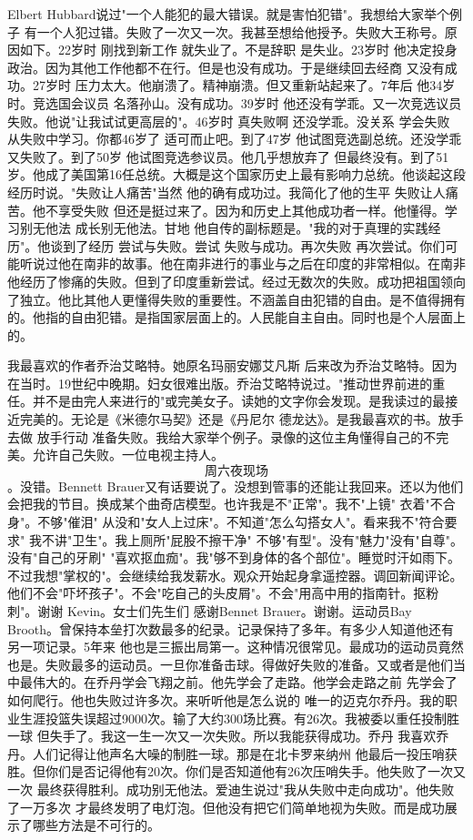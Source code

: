 Elbert Hubbard说过"一个人能犯的最大错误。就是害怕犯错"。我想给大家举个例子 有一个人犯过错。失败了一次又一次。我甚至想给他授予。失败大王称号。原因如下。22岁时 刚找到新工作 就失业了。不是辞职 是失业。23岁时 他决定投身政治。因为其他工作他都不在行。但是也没有成功。于是继续回去经商 又没有成功。27岁时 压力太大。他崩溃了。精神崩溃。但又重新站起来了。7年后 他34岁时。竞选国会议员 名落孙山。没有成功。39岁时 他还没有学乖。又一次竞选议员失败。他说"让我试试更高层的"。46岁时 真失败啊 还没学乖。没关系 学会失败 从失败中学习。你都46岁了 适可而止吧。到了47岁 他试图竞选副总统。还没学乖 又失败了。到了50岁 他试图竞选参议员。他几乎想放弃了 但最终没有。到了51岁。他成了美国第16任总统。大概是这个国家历史上最有影响力总统。他谈起这段经历时说。"失败让人痛苦"当然 他的确有成功过。我简化了他的生平 失败让人痛苦。他不享受失败 但还是挺过来了。因为和历史上其他成功者一样。他懂得。学习别无他法 成长别无他法。甘地 他自传的副标题是。"我的对于真理的实践经历"。他谈到了经历 尝试与失败。尝试 失败与成功。再次失败 再次尝试。你们可能听说过他在南非的故事。他在南非进行的事业与之后在印度的非常相似。在南非 他经历了惨痛的失败。但到了印度重新尝试。经过无数次的失败。成功把祖国领向了独立。他比其他人更懂得失败的重要性。不涵盖自由犯错的自由。是不值得拥有的。他指的自由犯错。是指国家层面上的。人民能自主自由。同时也是个人层面上的。 

我最喜欢的作者乔治艾略特。她原名玛丽安娜艾凡斯 后来改为乔治艾略特。因为在当时。19世纪中晚期。妇女很难出版。乔治艾略特说过。"推动世界前进的重任。并不是由完人来进行的"或完美女子。读她的文字你会发现。是我读过的最接近完美的。无论是《米德尔马契》还是《丹尼尔 德龙达》。是我最喜欢的书。放手去做 放手行动 准备失败。我给大家举个例子。录像的这位主角懂得自己的不完美。允许自己失败。一位电视主持人。\[周六夜现场\]。没错。Bennett Brauer又有话要说了。没想到管事的还能让我回来。还以为他们会把我的节目。换成某个曲奇店模型。也许我是不"正常"。我不"上镜" 衣着"不合身"。不够"催泪" 从没和"女人上过床"。不知道"怎么勾搭女人"。看来我不"符合要求" 我不讲"卫生"。我上厕所"屁股不擦干净" 不够"有型"。没有"魅力"没有"自尊"。没有"自己的牙刷" "喜欢抠血痂"。我"够不到身体的各个部位"。睡觉时汗如雨下。不过我想"掌权的"。会继续给我发薪水。观众开始起身拿遥控器。调回新闻评论。他们不会"吓坏孩子"。不会"吃自己的头皮屑"。不会"用高中用的指南针。抠粉刺"。谢谢 Kevin。女士们先生们 感谢Bennet Brauer。谢谢。运动员Bay Brooth。曾保持本垒打次数最多的纪录。记录保持了多年。有多少人知道他还有另一项记录。5年来 他也是三振出局第一。这种情况很常见。最成功的运动员竟然也是。失败最多的运动员。一旦你准备击球。得做好失败的准备。又或者是他们当中最伟大的。在乔丹学会飞翔之前。他先学会了走路。他学会走路之前 先学会了如何爬行。他也失败过许多次。来听听他是怎么说的 唯一的迈克尔乔丹。我的职业生涯投篮失误超过9000次。输了大约300场比赛。有26次。我被委以重任投制胜一球 但失手了。我这一生一次又一次失败。所以我能获得成功。乔丹 我喜欢乔丹。人们记得让他声名大噪的制胜一球。那是在北卡罗来纳州 他最后一投压哨获胜。但你们是否记得他有20次。你们是否知道他有26次压哨失手。他失败了一次又一次 最终获得胜利。成功别无他法。爱迪生说过"我从失败中走向成功"。他失败了一万多次 才最终发明了电灯泡。但他没有把它们简单地视为失败。而是成功展示了哪些方法是不可行的。 

